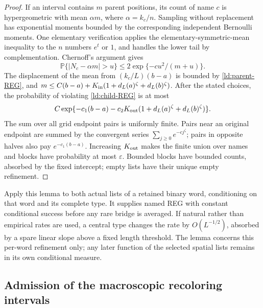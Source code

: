 \begin{proof}
If an interval contains \(m\) parent positions, its count of name
\(c\) is hypergeometric with mean \(\alpha m\), where
\(\alpha=k_c/n\).  Sampling without replacement has exponential
moments bounded by the corresponding independent Bernoulli moments.
One elementary verification applies the elementary-symmetric-mean
inequality to the \(n\) numbers \(e^t\) or \(1\), and handles
the lower tail by complementation.  Chernoff's argument gives
\[
 \mathbb P\{|N_c-\alpha m|>u\}\le
       2\exp\{-cu^2/(m+u)\}.
\]
The displacement of the mean from \((k_c/L)(b-a)\) is bounded by
\eqref{ld:parent-REG}, and
\(m\le C(b-a)+K_{\rm in}(1+d_L(a)^\zeta+d_L(b)^\zeta)\).
After the stated choices, the probability of violating
\eqref{ld:child-REG} is at most
\[
 C\exp\{-c_1(b-a)-c_2K_{\rm out}
                 (1+d_L(a)^\zeta+d_L(b)^\zeta)\}.
\]
The sum over all grid endpoint pairs is uniformly finite.  Pairs
near an original endpoint are summed by the convergent series
\(\sum_{j\ge0}e^{-cj^\zeta}\); pairs in opposite halves also pay
\(e^{-c_1(b-a)}\).  Increasing \(K_{\rm out}\) makes the finite
union over names and blocks have probability at most
\(\varepsilon\).  Bounded blocks have bounded counts, absorbed
by the fixed intercept; empty lists have their unique empty refinement.
\end{proof}

Apply this lemma to both actual lists of a retained binary word,
conditioning on that word and its complete type.  It supplies named
REG with constant conditional success before any rare bridge is
averaged.  If natural rather than empirical rates are used, a central
type changes the rate by \(O(L^{-1/2})\), absorbed by a spare
linear slope above a fixed length threshold.  The lemma concerns
this per-word refinement only; any later function of the selected
spatial lists remains in its own conditional measure.

\subsection{Admission of the macroscopic recoloring intervals}

